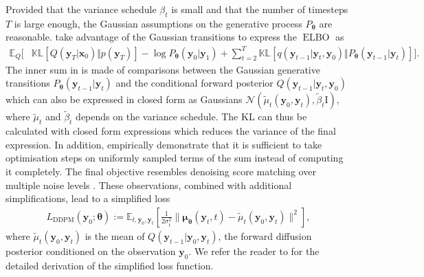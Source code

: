 Provided that the variance schedule $\beta_t$ is small and that the number of timesteps $T$ is large enough, the Gaussian assumptions on the generative process $P_{\bm{\theta}}$ are reasonable. \citet{ho_denoising_2020} take advantage of the Gaussian transitions to express the $\operatorname{ELBO}$ as
\begin{align}
        \mathbb{E}_Q \biggl[& \mathbb{KL}\left[Q(\mathbf{y}_T|\mathbf{x}_0)\Vert p(\mathbf{y}_T)\right] - \log P_{\bm{\theta}}(\mathbf{y}_0|\mathbf{y}_1) + \sum_{t=2}^T \mathbb{KL}\left[q(\mathbf{y}_{t-1}|\mathbf{y}_t, \mathbf{y}_0)\Vert P_{\bm{\theta}}(\mathbf{y}_{t-1}|\mathbf{y}_t)\right]
     \biggr]. \label{eq:simple_DDPM_ELBO}
\end{align}
The inner sum in  is made of comparisons between the Gaussian generative transitions $P_{\bm{\theta}}(\mathbf{y}_{t-1}|\mathbf{y}_t)$ and the conditional forward posterior $Q(\mathbf{y}_{t-1}|\mathbf{y}_t, \mathbf{y}_0)$ which can also be expressed in closed form as Gaussians $\mathcal{N}(\tilde{\mu}_t(\mathbf{y}_0, \mathbf{y}_t), \tilde{\beta}_t \text{I})$, where $\tilde{\mu}_t$ and $\tilde{\beta}_t$ depends on the variance schedule. The KL can thus be calculated with closed form expressions which reduces the variance of the final expression.
In addition, \citet{ho_denoising_2020} empirically demonstrate that it is sufficient to take optimisation steps on uniformly sampled terms of the sum instead of computing it completely. The final objective resembles denoising score matching over multiple noise levels \citep{vincent2011connection}. These observations, combined with additional simplifications, lead to a simplified loss
\begin{align}
    L_\text{DDPM}(\mathbf{y}_0; \bm{\theta}) := \mathbb{E}_{t, \mathbf{y}_0, \mathbf{y}_t}\left[ \frac{1}{2\sigma^2_t}\lVert \mathbf{\mu}_{\bm{\theta}}(\mathbf{y}_t, t) - \tilde{\mu}_t(\mathbf{y}_0, \mathbf{y}_t)  \rVert^2\right],
\end{align}
where $\tilde{\mu}_t(\mathbf{y}_0, \mathbf{y}_t)$ is the mean of $Q(\mathbf{y}_{t-1}|\mathbf{y}_{0}, \mathbf{y}_{t})$, the forward diffusion posterior conditioned on the observation $\mathbf{y}_{0}$. We refer the reader to \citet{ho_denoising_2020} for the detailed derivation of the simplified loss function.

